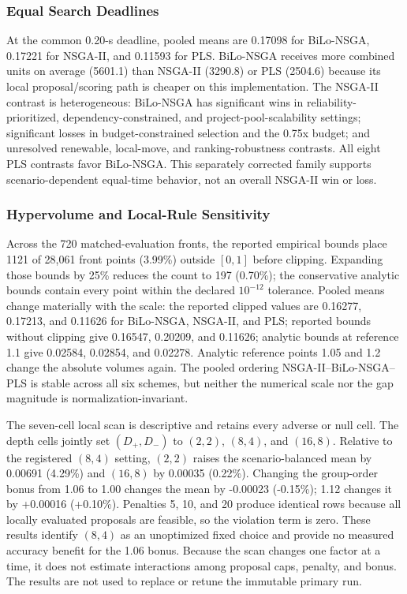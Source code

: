\documentclass[applsci,article,submit,moreauthors]{Definitions/mdpi}
\begin{document}
\subsubsection{Equal Search Deadlines}\label{equal-search-deadlines}

At the common 0.20-s deadline, pooled means are 0.17098 for BiLo-NSGA, 0.17221 for NSGA-II, and 0.11593 for PLS. BiLo-NSGA receives more combined units on average (5601.1) than NSGA-II (3290.8) or PLS (2504.6) because its local proposal/scoring path is cheaper on this implementation. The NSGA-II contrast is heterogeneous: BiLo-NSGA has significant wins in reliability-prioritized, dependency-constrained, and project-pool-scalability settings; significant losses in budget-constrained selection and the 0.75x budget; and unresolved renewable, local-move, and ranking-robustness contrasts. All eight PLS contrasts favor BiLo-NSGA. This separately corrected family supports scenario-dependent equal-time behavior, not an overall NSGA-II win or loss.

\subsubsection{Hypervolume and Local-Rule Sensitivity}\label{hypervolume-and-local-rule-sensitivity}

Across the 720 matched-evaluation fronts, the reported empirical bounds place 1121 of 28,061 front points (3.99\%) outside \([0,1]\) before clipping. Expanding those bounds by 25\% reduces the count to 197 (0.70\%); the conservative analytic bounds contain every point within the declared \(10^{-12}\) tolerance. Pooled means change materially with the scale: the reported clipped values are 0.16277, 0.17213, and 0.11626 for BiLo-NSGA, NSGA-II, and PLS; reported bounds without clipping give 0.16547, 0.20209, and 0.11626; analytic bounds at reference 1.1 give 0.02584, 0.02854, and 0.02278. Analytic reference points 1.05 and 1.2 change the absolute volumes again. The pooled ordering NSGA-II--BiLo-NSGA--PLS is stable across all six schemes, but neither the numerical scale nor the gap magnitude is normalization-invariant.

The seven-cell local scan is descriptive and retains every adverse or null cell. The depth cells jointly set \((D_+,D_-)\) to \((2,2)\), \((8,4)\), and \((16,8)\). Relative to the registered \((8,4)\) setting, \((2,2)\) raises the scenario-balanced mean by 0.00691 (4.29\%) and \((16,8)\) by 0.00035 (0.22\%). Changing the group-order bonus from 1.06 to 1.00 changes the mean by -0.00023 (-0.15\%); 1.12 changes it by +0.00016 (+0.10\%). Penalties 5, 10, and 20 produce identical rows because all locally evaluated proposals are feasible, so the violation term is zero. These results identify \((8,4)\) as an unoptimized fixed choice and provide no measured accuracy benefit for the 1.06 bonus. Because the scan changes one factor at a time, it does not estimate interactions among proposal caps, penalty, and bonus. The results are not used to replace or retune the immutable primary run.
\end{document}
